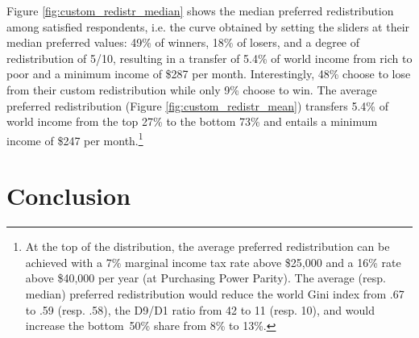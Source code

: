 \documentclass[12pt,english]{article}
\begin{document}
\begin{bibunit}
Figure \ref{fig:custom_redistr_median} shows the median preferred redistribution among satisfied respondents, i.e. the curve obtained by setting the sliders at their median preferred values: 49\% of winners, 18\% of losers, and a degree of redistribution of 5/10, resulting in a transfer of 5.4\% of world income from rich to poor and a minimum income of \$287 per month.
Interestingly, 48\% choose to lose from their custom redistribution while only 9\% choose to win. %
The average preferred redistribution (Figure \ref{fig:custom_redistr_mean}) transfers 5.4\% of world income from the top 27\% to the bottom 73\% and entails a minimum income of \$247 per month.\footnote{At the top of the distribution, the average preferred redistribution can be achieved with a 7\% marginal income tax rate above \$25,000 and a 16\% rate above \$40,000 per year (at Purchasing Power Parity). The average (resp. median) preferred redistribution would reduce the world Gini index from .67 to .59 (resp. .58), the D9/D1 ratio from 42 to 11 (resp. 10), and would increase the bottom~50\% share from 8\% to 13\%.}


\section{Conclusion}


\end{bibunit}
\end{document}
